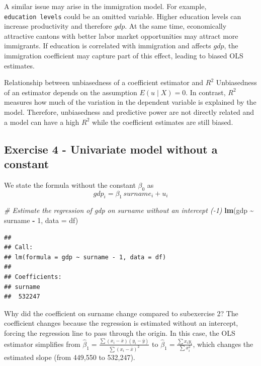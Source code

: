 \documentclass[
]{article}
\newenvironment{Shaded}{\begin{snugshade}}{\end{snugshade}}
\newcommand{\AttributeTok}[1]{\textcolor[rgb]{0.13,0.29,0.53}{#1}}
\newcommand{\CommentTok}[1]{\textcolor[rgb]{0.56,0.35,0.01}{\textit{#1}}}
\newcommand{\DecValTok}[1]{\textcolor[rgb]{0.00,0.00,0.81}{#1}}
\newcommand{\FunctionTok}[1]{\textcolor[rgb]{0.13,0.29,0.53}{\textbf{#1}}}
\newcommand{\NormalTok}[1]{#1}
\newcommand{\SpecialCharTok}[1]{\textcolor[rgb]{0.81,0.36,0.00}{\textbf{#1}}}
\begin{document}
A similar issue may arise in the immigration model. For example,
\texttt{education\ levels} could be an omitted variable. Higher
education levels can increase productivity and therefore \(gdp\). At the
same time, economically attractive cantons with better labor market
opportunities may attract more immigrants. If education is correlated
with immigration and affects \(gdp\), the immigration coefficient may
capture part of this effect, leading to biased OLS estimates.

Relationship between unbiasedness of a coefficient estimator and \(R^2\)
Unbiasedness of an estimator depends on the assumption
\(E(u \mid X) = 0\). In contrast, \(R^2\) measures how much of the
variation in the dependent variable is explained by the model.
Therefore, unbiasedness and predictive power are not directly related
and a model can have a high \(R^2\) while the coefficient estimates are
still biased.

\subsection{Exercise 4 - Univariate model without a
constant}\label{exercise-4---univariate-model-without-a-constant}

We state the formula without the constant \(\beta_0\) as \[
gdp_i = \beta_1 \, surname_i + u_i
\]

\begin{Shaded}
\begin{Highlighting}[]
\CommentTok{\# Estimate the regression of gdp on surname without an intercept ({-}1)}
\FunctionTok{lm}\NormalTok{(gdp }\SpecialCharTok{\textasciitilde{}}\NormalTok{ surname }\SpecialCharTok{{-}} \DecValTok{1}\NormalTok{, }\AttributeTok{data =}\NormalTok{ df)}
\end{Highlighting}
\end{Shaded}

\begin{verbatim}
## 
## Call:
## lm(formula = gdp ~ surname - 1, data = df)
## 
## Coefficients:
## surname  
##  532247
\end{verbatim}

Why did the coefficient on surname change compared to subexercise 2? The
coefficient changes because the regression is estimated without an
intercept, forcing the regression line to pass through the origin. In
this case, the OLS estimator simplifies from
\(\hat{\beta}_1 = \frac{\sum (x_i-\bar{x})(y_i-\bar{y})}{\sum (x_i-\bar{x})^2}\)
to \(\hat{\beta}_1 = \frac{\sum x_i y_i}{\sum x_i^2}\), which changes
the estimated slope (from 449,550 to 532,247).
\end{document}
